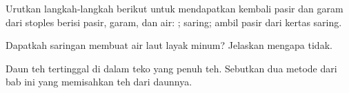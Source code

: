 \begin{exercise}[$\star$]\label{exo:g3:separating-mixtures:9}
Urutkan langkah-langkah berikut untuk mendapatkan kembali pasir dan
garam dari stoples berisi pasir, garam, dan air:  ;
saring; ambil pasir dari kertas saring.
\end{exercise}

\begin{exercise}[$\star\star$]\label{exo:g3:separating-mixtures:10}
Dapatkah saringan membuat air laut layak minum? Jelaskan mengapa tidak.
\end{exercise}

\begin{exercise}[$\star\star$]\label{exo:g3:separating-mixtures:11}
Daun teh tertinggal di dalam teko yang penuh teh. Sebutkan dua metode
dari bab ini yang memisahkan teh dari daunnya.
\end{exercise}
